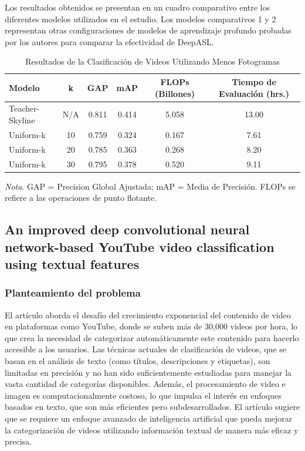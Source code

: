 Los resultados obtenidos se presentan en un cuadro comparativo entre los diferentes modelos utilizados en el estudio. Los modelos comparativos 1 y 2 representan otras configuraciones de modelos de aprendizaje profundo probadas por los autores para comparar la efectividad de DeepASL.
\begin{table}[h]
    \centering
    \caption{Resultados de la Clasificación de Videos Utilizando Menos Fotogramas}
    \begin{tabular}{lccccc}
        \hline
        \textbf{Modelo} & \textbf{k} & \textbf{GAP} & \textbf{mAP} & \textbf{FLOPs (Billones)} & \textbf{Tiempo de Evaluación (hrs.)} \\
        \hline
        Teacher-Skyline & N/A  & 0.811 & 0.414 & 5.058 & 13.00 \\
        Uniform-k       & 10   & 0.759 & 0.324 & 0.167 & 7.61  \\
        Uniform-k       & 20   & 0.785 & 0.363 & 0.268 & 8.20  \\
        Uniform-k       & 30   & 0.795 & 0.378 & 0.520 & 9.11  \\
        \hline
    \end{tabular}
    \label{table:video_classification}
    \begin{flushleft}
    \textit{Nota}. GAP = Precision Global Ajustada; mAP = Media de Precisión. FLOPs se refiere a las operaciones de punto flotante.
    \end{flushleft}
\end{table}



\subsection{An improved deep convolutional neural network-based YouTube video classification using textual features}
\cite{raza2024improved}
\subsubsection{Planteamiento del problema}
El artículo aborda el desafío del crecimiento exponencial del contenido de video en plataformas como YouTube, donde se suben más de 30,000 videos por hora, lo que crea la necesidad de categorizar automáticamente este contenido para hacerlo accesible a los usuarios. Las técnicas actuales de clasificación de videos, que se basan en el análisis de texto (como títulos, descripciones y etiquetas), son limitadas en precisión y no han sido suficientemente estudiadas para manejar la vasta cantidad de categorías disponibles. Además, el procesamiento de video e imagen es computacionalmente costoso, lo que impulsa el interés en enfoques basados en texto, que son más eficientes pero subdesarrollados. El artículo sugiere que se requiere un enfoque avanzado de inteligencia artificial que pueda mejorar la categorización de videos utilizando información textual de manera más eficaz y precisa.
